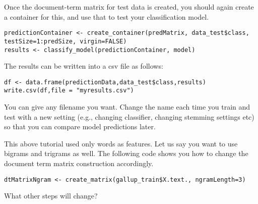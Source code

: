 \documentclass[11pt,a4paper]{article}
\begin{document}
Once the document-term matrix for test data is created, you should again create a container for this, and use that to test your classification model.
\begin{lstlisting}
predictionContainer <- create_container(predMatrix, data_test$class, testSize=1:predSize, virgin=FALSE)
results <- classify_model(predictionContainer, model)
\end{lstlisting}

The results can be written into a csv file as follows:
\begin{lstlisting}
df <- data.frame(predictionData,data_test$class,results)
write.csv(df,file = "myresults.csv")
\end{lstlisting}

You can give any filename you want. Change the name each time you train and test with a new setting (e.g., changing classifier, changing stemming settings etc) so that you can compare model predictions later. 

This above tutorial used only words as features. Let us say you want to use bigrams and trigrams as well. The following code shows you how to change the document term matrix construction accordingly.
\begin{lstlisting}
dtMatrixNgram <- create_matrix(gallup_train$X.text., ngramLength=3)
\end{lstlisting}
What other steps will change? 
\end{document}
